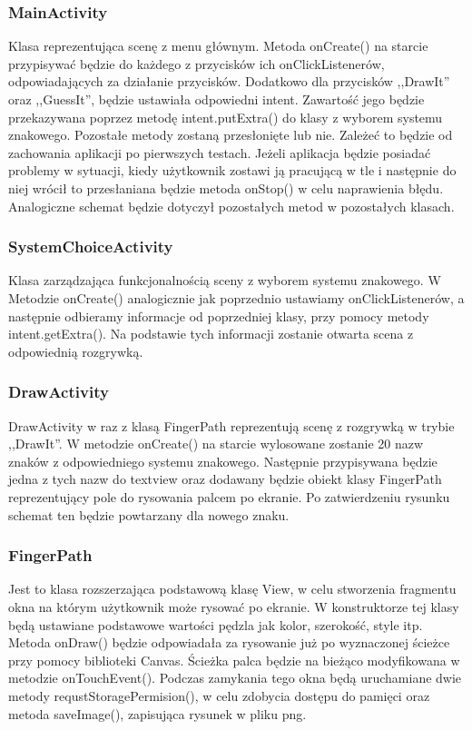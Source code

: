 \documentclass[15pt]{article}
\begin{document}
  \newpage
  \subsubsection{MainActivity}
  Klasa reprezentująca scenę z menu głównym. Metoda onCreate() na starcie przypisywać będzie do każdego z przycisków ich onClickListenerów, odpowiadających za działanie przycisków. Dodatkowo dla przycisków ,,DrawIt'' oraz ,,GuessIt'', będzie ustawiała odpowiedni intent. Zawartość jego będzie przekazywana poprzez metodę intent.putExtra() do klasy z wyborem systemu znakowego. Pozostałe metody zostaną przesłonięte lub nie. Zależeć to będzie od zachowania aplikacji po pierwszych testach. Jeżeli aplikacja będzie posiadać problemy w sytuacji, kiedy użytkownik zostawi ją pracującą w tle i następnie do niej wrócił to przesłaniana będzie metoda onStop() w celu naprawienia błędu. Analogiczne schemat będzie dotyczył pozostałych metod w pozostałych klasach. 
  \subsubsection{SystemChoiceActivity}
  Klasa zarządzająca funkcjonalnością sceny z wyborem systemu znakowego. W Metodzie onCreate()  analogicznie jak poprzednio ustawiamy onClickListenerów, a następnie odbieramy informacje od poprzedniej klasy, przy pomocy metody intent.getExtra(). Na podstawie tych informacji zostanie otwarta scena z odpowiednią rozgrywką. 
  
  \subsubsection{DrawActivity}
  DrawActivity w raz z klasą FingerPath reprezentują scenę z rozgrywką w trybie ,,DrawIt''. W metodzie onCreate() na starcie wylosowane zostanie 20 nazw znaków z odpowiedniego systemu znakowego. Następnie przypisywana będzie jedna z tych nazw do textview oraz dodawany będzie obiekt klasy FingerPath reprezentujący pole do rysowania palcem po ekranie. Po zatwierdzeniu rysunku schemat ten będzie powtarzany dla nowego znaku.
  
  \subsubsection{FingerPath}
  Jest to klasa rozszerzająca podstawową klasę View, w celu stworzenia fragmentu okna na którym użytkownik może rysować po ekranie. W konstruktorze tej klasy będą ustawiane podstawowe wartości pędzla jak kolor, szerokość, style itp. Metoda onDraw() będzie odpowiadała za rysowanie już po wyznaczonej ścieżce przy pomocy biblioteki Canvas. Ścieżka palca będzie na bieżąco modyfikowana w metodzie onTouchEvent(). Podczas zamykania tego okna będą uruchamiane dwie metody requstStoragePermision(), w celu zdobycia dostępu do pamięci oraz metoda saveImage(), zapisująca rysunek w pliku png.
  
\end{document}
